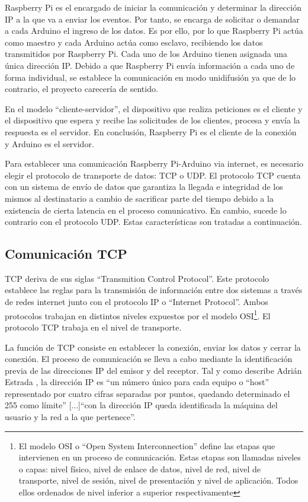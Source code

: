 Raspberry Pi es el encargado de iniciar la comunicación y determinar la dirección IP a la que va a enviar los eventos. Por tanto, se encarga de solicitar o demandar a cada Arduino el ingreso de los datos. Es por ello, por lo que Raspberry Pi actúa como maestro y cada Arduino actúa como esclavo, recibiendo los datos transmitidos por Raspberry Pi. Cada uno de los Arduino tienen asignada una única dirección IP. Debido a que Raspberry Pi envía información a cada uno de forma individual, se establece la comunicación en modo unidifusión ya que de lo contrario, el proyecto carecería de sentido.

En el modelo ``cliente-servidor'', el dispositivo que realiza peticiones es el cliente y el dispositivo que espera y recibe las solicitudes de los clientes, procesa y envía la respuesta es el servidor. En conclusión, Raspberry Pi es el cliente de la conexión y Arduino es el servidor.

Para establecer una comunicación Raspberry Pi-Arduino via internet, es necesario elegir el protocolo de transporte de datos: TCP o UDP. El protocolo TCP cuenta con un sistema de envío de datos que garantiza la llegada e integridad de los mismos al destinatario a cambio de sacrificar parte del tiempo debido a la existencia de cierta latencia en el proceso comunicativo. En cambio, sucede lo contrario con el protocolo UDP. Estas características son tratadas a continuación.


\subsection{Comunicación TCP} \label{s2_3_2}

TCP deriva de sus siglas ``Transmition Control Protocol''. Este protocolo establece las reglas para la transmisión de información entre dos sistemas a través de redes internet junto con el protocolo IP o ``Internet Protocol''. Ambos protocolos trabajan en distintos niveles expuestos por el modelo OSI\footnote{El modelo OSI o ``Open System Interconnection'' define las etapas que intervienen en un proceso de comunicación. Estas etapas son llamadas niveles o capas: nivel físico, nivel de enlace de datos, nivel de red, nivel de transporte, nivel de sesión, nivel de presentación y nivel de aplicación. Todos ellos ordenados de nivel inferior a superior respectivamente}. El protocolo TCP trabaja en el nivel de transporte.

La función de TCP consiste en establecer la conexión, enviar los datos y cerrar la conexión. El proceso de comunicación se lleva a cabo mediante la identificación previa de las direcciones IP del emisor y del receptor. Tal y como describe Adrián Estrada \citep{corona2004protocolos}, la dirección IP es ``un número único para cada equipo o ``host'' representado por cuatro cifras separadas por puntos, quedando determinado el 255 como límite'' [...]``con la dirección IP queda identificada la máquina del usuario y la red a la que pertenece''.


